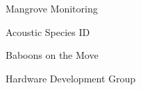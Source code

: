 \item Mangrove Monitoring
\item Acoustic Species ID
\item Baboons on the Move
\item Hardware Development Group
